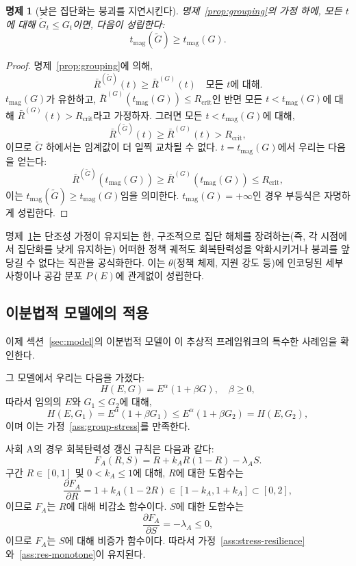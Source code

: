 \documentclass[11pt]{article}
\theoremstyle{plain}
\newtheorem{proposition}{명제}
\begin{document}
\begin{proposition}[낮은 집단화는 붕괴를 지연시킨다]
\label{prop:maginot}
명제~\ref{prop:grouping}의 가정 하에, 모든 $t$에 대해 $\tilde{G}_t \le G_t$이면, 다음이 성립한다:
\[
t_{\text{mag}}(\tilde{G}) \ge t_{\text{mag}}(G).
\]
\end{proposition}

\begin{proof}
명제~\ref{prop:grouping}에 의해,
\[
\bar{R}^{(\tilde{G})}(t) \ge \bar{R}^{(G)}(t) \quad \text{모든 } t \text{에 대해}.
\]
$t_{\text{mag}}(G)$가 유한하고, $\bar{R}^{(G)}(t_{\text{mag}}(G)) \le R_{\text{crit}}$인 반면 모든 $t < t_{\text{mag}}(G)$에 대해 $\bar{R}^{(G)}(t) > R_{\text{crit}}$라고 가정하자.
그러면 모든 $t < t_{\text{mag}}(G)$에 대해,
\[
\bar{R}^{(\tilde{G})}(t) \ge \bar{R}^{(G)}(t) > R_{\text{crit}},
\]
이므로 $\tilde{G}$ 하에서는 임계값이 더 일찍 교차될 수 없다.
$t = t_{\text{mag}}(G)$에서 우리는 다음을 얻는다:
\[
\bar{R}^{(\tilde{G})}(t_{\text{mag}}(G)) \ge \bar{R}^{(G)}(t_{\text{mag}}(G)) \le R_{\text{crit}},
\]
이는 $t_{\text{mag}}(\tilde{G}) \ge t_{\text{mag}}(G)$임을 의미한다.
$t_{\text{mag}}(G) = +\infty$인 경우 부등식은 자명하게 성립한다.
\end{proof}

명제~\ref{prop:maginot}는 단조성 가정이 유지되는 한, 구조적으로 집단 해체를 장려하는(즉, 각 시점에서 집단화를 낮게 유지하는) 어떠한 정책 궤적도 회복탄력성을 악화시키거나 붕괴를 앞당길 수 없다는 직관을 공식화한다.
이는 $\theta$(정책 체제, 지원 강도 등)에 인코딩된 세부 사항이나 공감 분포 $P(E)$에 관계없이 성립한다.

\subsection{이분법적 모델에의 적용}

이제 섹션~\ref{sec:model}의 이분법적 모델이 이 추상적 프레임워크의 특수한 사례임을 확인한다.

그 모델에서 우리는 다음을 가졌다:
\[
H(E,G) = E^{\alpha} (1 + \beta G), \quad \beta \ge 0,
\]
따라서 임의의 $E$와 $G_1 \le G_2$에 대해,
\[
H(E,G_1) = E^{\alpha} (1 + \beta G_1)
\le E^{\alpha} (1 + \beta G_2) = H(E,G_2),
\]
이며 이는 가정~\ref{ass:group-stress}를 만족한다.

사회 A의 경우 회복탄력성 갱신 규칙은 다음과 같다:
\[
F_A(R,S) = R + k_A R(1-R) - \lambda_A S.
\]
구간 $R \in [0,1]$ 및 $0 < k_A \le 1$에 대해, $R$에 대한 도함수는
\[
\frac{\partial F_A}{\partial R}
= 1 + k_A (1 - 2R)
\in [1 - k_A, 1 + k_A] \subset [0,2],
\]
이므로 $F_A$는 $R$에 대해 비감소 함수이다.
$S$에 대한 도함수는
\[
\frac{\partial F_A}{\partial S} = -\lambda_A \le 0,
\]
이므로 $F_A$는 $S$에 대해 비증가 함수이다.
따라서 가정~\ref{ass:stress-resilience}와~\ref{ass:res-monotone}이 유지된다.
\end{document}
